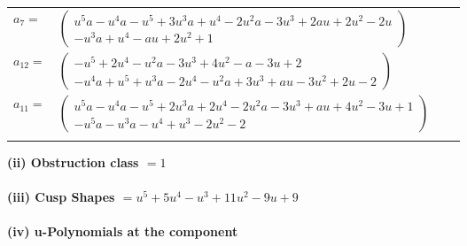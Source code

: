 \documentclass[1p]{elsarticle_modified}
\theoremstyle{definition}
\begin{document}
\begin{tabular}{m{7pt} m{180pt} m{7pt} m{180pt} }
\flushright $a_{7}=$&$\begin{pmatrix}u^5 a- u^4 a- u^5+3 u^3 a+u^4-2 u^2 a-3 u^3+2 a u+2 u^2-2 u\\- u^3 a+u^4- a u+2 u^2+1\end{pmatrix}$ \\
\flushright $a_{12}=$&$\begin{pmatrix}- u^5+2 u^4- u^2 a-3 u^3+4 u^2- a-3 u+2\\- u^4 a+u^5+u^3 a-2 u^4- u^2 a+3 u^3+a u-3 u^2+2 u-2\end{pmatrix}$ \\
\flushright $a_{11}=$&$\begin{pmatrix}u^5 a- u^4 a- u^5+2 u^3 a+2 u^4-2 u^2 a-3 u^3+a u+4 u^2-3 u+1\\- u^5 a- u^3 a- u^4+u^3-2 u^2-2\end{pmatrix}$\\&\end{tabular}
\flushleft \textbf{(ii) Obstruction class $= 1$}\\~\\
\flushleft \textbf{(iii) Cusp Shapes $= u^5+5 u^4- u^3+11 u^2-9 u+9$}\\~\\
\newpage\renewcommand{\arraystretch}{1}
\flushleft \textbf{(iv) u-Polynomials at the component}\newline \\
\end{document}
